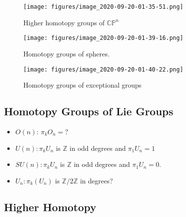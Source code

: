 \begin{figure}
\centering
\texttt{[image: figures/image\_2020-09-20-01-35-51.png]}
\caption{Higher homotopy groups of \({\mathbb{CP}}^n\)}
\end{figure}

\begin{figure}
\centering
\texttt{[image: figures/image\_2020-09-20-01-39-16.png]}
\caption{Homotopy groups of spheres.}
\end{figure}

\begin{figure}
\centering
\texttt{[image: figures/image\_2020-09-20-01-40-22.png]}
\caption{Homotopy groups of exceptional groups}
\end{figure}

\hypertarget{homotopy-groups-of-lie-groups}{%
\subsection{Homotopy Groups of Lie
Groups}\label{homotopy-groups-of-lie-groups}}

\begin{itemize}
\tightlist
\item
  \(O(n)\): \(\pi_k O_n = ?\)
\item
  \(U(n): \pi_k U_n\) is \({\mathbb{Z}}\) in odd degrees and
  \(\pi_1 U_n = 1\) 
\item
  \(SU(n): \pi_k U_n\) is \({\mathbb{Z}}\) in odd degrees and
  \(\pi_1 U_n = 0\).
\item
  \(U_n: \pi_k(U_n)\) is \({\mathbb{Z}}/2{\mathbb{Z}}\) in degrees?
\end{itemize}

\hypertarget{higher-homotopy}{%
\subsection{Higher Homotopy}\label{higher-homotopy}}

